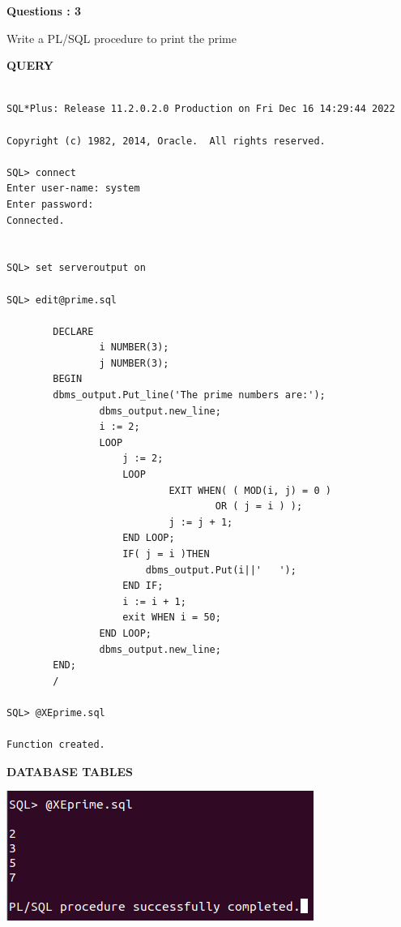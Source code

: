\documentclass[a4paper,12pt]{report}
\begin{document}
\begin{flushleft}
    \textbf{Questions : 3}
\end{flushleft}
Write a PL/SQL procedure to print the prime 
	\begin{flushleft}
		\textbf{QUERY }
	\end{flushleft}
 \begin{verbatim}
 
SQL*Plus: Release 11.2.0.2.0 Production on Fri Dec 16 14:29:44 2022

Copyright (c) 1982, 2014, Oracle.  All rights reserved.

SQL> connect
Enter user-name: system
Enter password:
Connected.


SQL> set serveroutput on

SQL> edit@prime.sql

		DECLARE
    			i NUMBER(3);
    			j NUMBER(3);
		BEGIN
		dbms_output.Put_line('The prime numbers are:');
				dbms_output.new_line;
    			i := 2;
    			LOOP
        			j := 2;
        			LOOP
            				EXIT WHEN( ( MOD(i, j) = 0 )
                        			OR ( j = i ) );
            				j := j + 1;
        			END LOOP;
        			IF( j = i )THEN
         				dbms_output.Put(i||'   ');		   
        			END IF;
        			i := i + 1;
        			exit WHEN i = 50;
    			END LOOP;
				dbms_output.new_line;
		END;
		/
		
SQL> @XEprime.sql

Function created.

\end{verbatim}
\begin{flushleft}
		\textbf{DATABASE TABLES} 
\end{flushleft} 

\includegraphics[scale=0.7]{PRIME.png}
\end{document}
